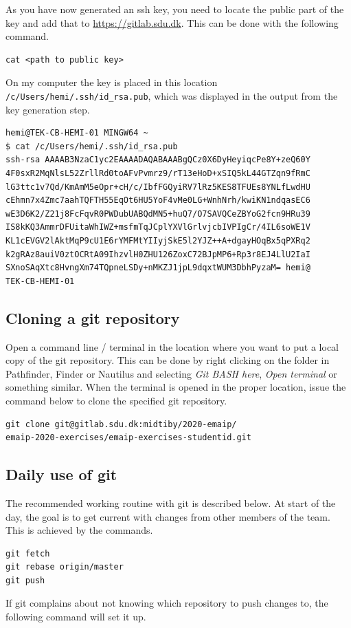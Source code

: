 \documentclass[12pt,a4paper]{article}
\newcounter{ex}
\numberwithin{ex}{section}
\begin{document}
As you have now generated an ssh key, you need to locate the 
public part of the key and add that to \url{https://gitlab.sdu.dk}.
This can be done with the following command.
\begin{verbatim}
cat <path to public key>
\end{verbatim}

On my computer the key is placed in this location 
\verb!/c/Users/hemi/.ssh/id_rsa.pub!, which was displayed 
in the output from the key generation step.

\begin{verbatim}
hemi@TEK-CB-HEMI-01 MINGW64 ~
$ cat /c/Users/hemi/.ssh/id_rsa.pub
ssh-rsa AAAAB3NzaC1yc2EAAAADAQABAAABgQCz0X6DyHeyiqcPe8Y+zeQ60Y
4F0sxR2MqNlsL52ZrllRd0toAFvPvmrz9/rT13eHoD+xSIQ5kL44GTZqn9fRmC
lG3ttc1v7Qd/KmAmM5eOpr+cH/c/IbfFGQyiRV7lRz5KES8TFUEs8YNLfLwdHU
cEhmn7x4Zmc7aahTQFTH55EqOt6HU5YoF4vMe0LG+WnhNrh/kwiKN1ndqasEC6
wE3D6K2/Z21j8FcFqvR0PWDubUABQdMN5+huQ7/O7SAVQCeZBYoG2fcn9HRu39
IS8kKQ3AmmrDFUitaWhIWZ+msfmTqJCplYXVlGrlvjcbIVPIgCr/4IL6soWE1V
KL1cEVGV2lAktMqP9cU1E6rYMFMtYIIyjSkE5l2YJZ++A+dgayHOqBx5qPXRq2
k2gRAz8auiV0ztOCRtA09IhzvlH0ZHU126ZoxC72BJpMP6+Rp3r8EJ4LlU2IaI
SXnoSAqXtc8HvngXm74TQpneLSDy+nMKZJ1jpL9dqxtWUM3DbhPyzaM= hemi@
TEK-CB-HEMI-01
\end{verbatim}


\subsection{Cloning a git repository}

Open a command line / terminal in the location where you
want to put a local copy of the git repository.
This can be done by right clicking on the folder in 
Pathfinder, Finder or Nautilus and selecting 
\emph{Git BASH here}, \emph{Open terminal} or something similar.
When the terminal is opened in the proper location, issue the 
command below to clone the specified git repository.
\begin{verbatim}
git clone git@gitlab.sdu.dk:midtiby/2020-emaip/
emaip-2020-exercises/emaip-exercises-studentid.git

\end{verbatim}


\subsection{Daily use of git}

The recommended working routine with git is 
described below.
At start of the day, the goal is to get current
with changes from other members of the team.
This is achieved by the commands.
\begin{verbatim}
git fetch
git rebase origin/master
git push
\end{verbatim}
If git complains about not knowing which repository to push
changes to, the following command will
set it up.
\end{document}
